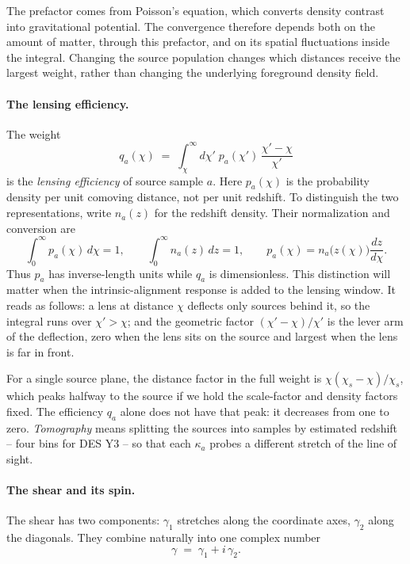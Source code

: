 \documentclass[11pt]{article}
\numberwithin{equation}{section}
\begin{document}
The prefactor comes from Poisson's equation, which converts density
contrast into gravitational potential. The convergence therefore depends
both on the amount of matter, through this prefactor, and on its spatial
fluctuations inside the integral. Changing the source population changes
which distances receive the largest weight, rather than changing the
underlying foreground density field.

\paragraph{The lensing efficiency.}
The weight
\begin{equation}
  q_a(\chi) \;=\;
  \int_\chi^{\infty} d\chi'\;
  p_a(\chi')\, \frac{\chi' - \chi}{\chi'}
  \label{eq:qdef}
\end{equation}
is the \emph{lensing efficiency} of source sample $a$. Here
$p_a(\chi)$ is the probability density per unit comoving distance,
not per unit redshift. To distinguish the two representations, write
$n_a(z)$ for the redshift density. Their normalization and conversion are
\begin{equation}
  \int_0^\infty p_a(\chi)\,d\chi=1,
  \qquad \int_0^\infty n_a(z)\,dz=1,
  \qquad p_a(\chi)=n_a\bigl(z(\chi)\bigr)\frac{dz}{d\chi}.
  \label{eq:sourcedensityunits}
\end{equation}
Thus $p_a$ has inverse-length units while $q_a$ is dimensionless.
This distinction will matter when the intrinsic-alignment response is
added to the lensing window.  It reads
as follows: a lens at distance $\chi$ deflects only sources behind
it, so the integral runs over $\chi' > \chi$; and the geometric
factor $(\chi' - \chi)/\chi'$ is the lever arm of the deflection, zero
when the lens sits on the source and largest when the lens is far in
front.

For a single source plane, the distance factor in the full weight is
$\chi(\chi_s-\chi)/\chi_s$, which peaks halfway to the source
if we hold the scale-factor and density factors fixed. The efficiency
$q_a$ alone does not have that peak: it decreases from one to zero.
\emph{Tomography} means splitting the sources into samples by
estimated redshift -- four bins for DES Y3 -- so that each
$\kappa_a$ probes a different stretch of the line of sight.

\paragraph{The shear and its spin.}
The shear has two components: $\gamma_1$ stretches along the
coordinate axes, $\gamma_2$ along the diagonals.  They combine
naturally into one complex number
\begin{equation}
  \gamma \;=\; \gamma_1 + i\,\gamma_2 .
  \label{eq:gammacomplex}
\end{equation}
\end{document}
